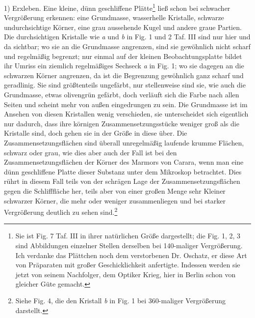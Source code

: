 \documentclass[a4paper, 11pt, oneside]{article}
\begin{document}
1) Erxleben. Eine kleine, dünn geschliffene Plätte\footnote{Sie ist Fig. 7 Taf. III in ihrer natürlichen Größe dargestellt; die Fig. 1, 2, 3 sind Abbildungen einzelner Stellen derselben bei 140-maliger Vergrößerung. Ich verdanke das Plättchen noch dem verstorbenen Dr. Oschatz, er diese Art von Präparaten mit großer Geschicklichkeit anfertigte. Indessen werden sie jetzt von seinem Nachfolger, dem Optiker Krieg, hier in Berlin schon von gleicher Güte gemacht.} ließ schon bei schwacher Vergrößerung erkennen: eine Grundmasse, wasserhelle Kristalle, schwarze undurchsichtige Körner, eine grau aussehende Kugel und andere graue Partien. Die durchsichtigen Kristalle wie \emph{a} und \emph{b} in Fig. 1 und 2 Taf. III sind nur hier und da sichtbar; wo sie an die Grundmasse angrenzen, sind sie gewöhnlich nicht scharf und regelmäßig begrenzt; nur einmal auf der kleinen Beobachtungsplatte bildet ihr Umriss ein ziemlich regelmäßiges Sechseck \emph{a} in Fig. 1; wo sie dagegen an die schwarzen Körner angrenzen, da ist die Begrenzung gewöhnlich ganz scharf und geradlinig. Sie sind größtenteils ungefärbt, nur stellenweise sind sie, wie auch die Grundmasse, etwas olivengrün gefärbt, doch verläuft sich die Farbe nach allen Seiten und scheint mehr von außen eingedrungen zu sein. Die Grundmasse ist im Ansehen von diesen Kristallen wenig verschieden, sie unterscheidet sich eigentlich nur dadurch, dass ihre körnigen Zusammensetzungsstücke weniger groß als die Kristalle sind, doch gehen sie in der Größe in diese über. Die Zusammensetzungsflächen sind überall unregelmäßig laufende krumme Flächen, schwarz oder grau, wie dies aber auch der Fall ist bei den Zusammensetzungsflächen der Körner des Marmors von Carara, wenn man eine dünn geschliffene Platte dieser Substanz unter dem Mikroskop betrachtet. Dies rührt in diesem Fall teils von der schrägen Lage der Zusammensetzungsflächen gegen die Schlifffläche her, teils aber von einer großen Menge sehr Kleiner schwarzer Körner, die mehr oder weniger zusammenliegen und bei starker Vergrößerung deutlich zu sehen sind.\footnote{Siehe Fig. 4, die den Kristall \emph{b} in Fig. 1 bei 360-maliger Vergrößerung darstellt.}
\end{document}
